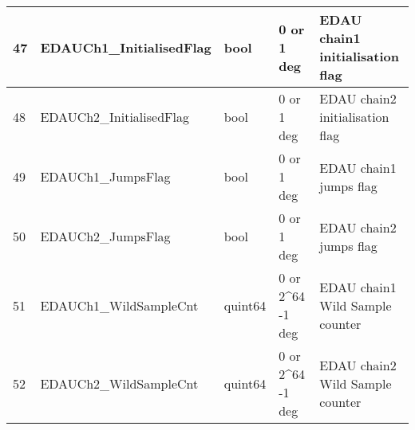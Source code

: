 \begin{landscape}
\begin{longtable}[c]{|l|l|l|l|l|}
	47   &  EDAUCh1\_InitialisedFlag            & bool     & 0 or 1 deg                                                          & EDAU chain1 initialisation flag\\ \hline
	48   &  EDAUCh2\_InitialisedFlag            & bool     & 0 or 1 deg                                                          & EDAU chain2 initialisation flag\\ \hline 
	49   &   EDAUCh1\_JumpsFlag            & bool     & 0 or 1 deg                                                          & EDAU chain1 jumps flag\\ \hline
	50   &   EDAUCh2\_JumpsFlag            & bool     & 0 or 1 deg                                                          & EDAU chain2 jumps flag\\ \hline
	51   &   EDAUCh1\_WildSampleCnt            & quint64     & 0 or 2\textasciicircum 64 -1  deg                                                          & EDAU chain1 Wild Sample counter\\ \hline
	52   &   EDAUCh2\_WildSampleCnt            & quint64     & 0 or 2\textasciicircum 64 -1  deg                                                          & EDAU chain2 Wild Sample counter\\ \hline
\end{longtable}






\end{landscape}
